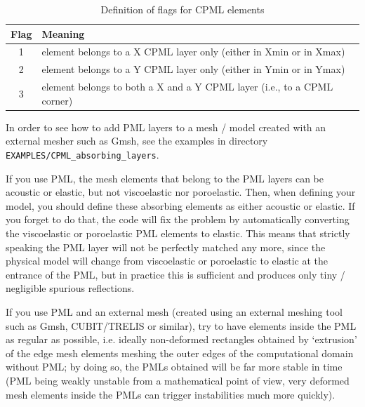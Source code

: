 \begin{table}[hb]
\caption{Definition of flags for CPML elements}
\centering
\begin{tabular}{c l}
\hline\hline
Flag& Meaning\\ [0.5ex]
\hline
1 & element belongs to a X CPML layer only (either in Xmin or in Xmax)\\
2 & element belongs to a Y CPML layer only (either in Ymin or in Ymax)\\
3 & element belongs to both a X and a Y CPML layer (i.e., to a CPML corner)\\ [1ex]
\hline
\end{tabular}
\label{table:CPMLflags}
\end{table}

In order to see how to add PML layers to a mesh / model created with an external mesher such as Gmsh, see the examples in directory
\texttt{EXAMPLES/CPML\_absorbing\_layers}.

If you use PML, the mesh elements that belong to the PML layers can be acoustic or elastic, but not viscoelastic nor poroelastic.
Then, when defining your model, you should define these absorbing elements as either acoustic or elastic.
If you forget to do that, the code will fix the problem by automatically converting the viscoelastic or poroelastic PML
elements to elastic. This means that strictly speaking the PML layer will not be perfectly matched any more, since the physical
model will change from viscoelastic or poroelastic to elastic at the entrance of the PML, but in practice this is sufficient and
produces only tiny / negligible spurious reflections.\newline

If you use PML and an external mesh (created using an external meshing tool
such as Gmsh, CUBIT/TRELIS or similar), try to have elements inside the PML as regular as possible,
i.e. ideally non-deformed rectangles obtained by `extrusion' of the edge mesh elements meshing the
outer edges of the computational domain without PML; by doing so, the PMLs obtained will be far more stable
in time (PML being weakly unstable from a mathematical point of view, very deformed mesh elements
inside the PMLs can trigger instabilities much more quickly).

